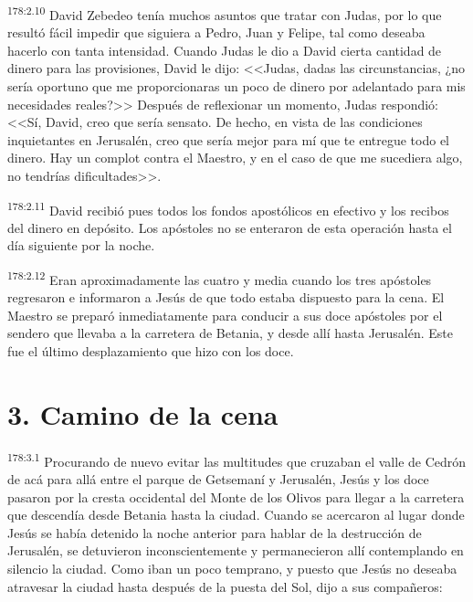 \par 
\textsuperscript{178:2.10} David Zebedeo tenía muchos asuntos que tratar con Judas, por lo que resultó fácil impedir que siguiera a Pedro, Juan y Felipe, tal como deseaba hacerlo con tanta intensidad. Cuando Judas le dio a David cierta cantidad de dinero para las provisiones, David le dijo: <<Judas, dadas las circunstancias, ¿no sería oportuno que me proporcionaras un poco de dinero por adelantado para mis necesidades reales?>> Después de reflexionar un momento, Judas respondió: <<Sí, David, creo que sería sensato. De hecho, en vista de las condiciones inquietantes en Jerusalén, creo que sería mejor para mí que te entregue todo el dinero. Hay un complot contra el Maestro, y en el caso de que me sucediera algo, no tendrías dificultades>>.

\par 
\textsuperscript{178:2.11} David recibió pues todos los fondos apostólicos en efectivo y los recibos del dinero en depósito. Los apóstoles no se enteraron de esta operación hasta el día siguiente por la noche.

\par 
\textsuperscript{178:2.12} Eran aproximadamente las cuatro y media cuando los tres apóstoles regresaron e informaron a Jesús de que todo estaba dispuesto para la cena. El Maestro se preparó inmediatamente para conducir a sus doce apóstoles por el sendero que llevaba a la carretera de Betania, y desde allí hasta Jerusalén. Este fue el último desplazamiento que hizo con los doce.

\section*{3. Camino de la cena}
\par 
\textsuperscript{178:3.1} Procurando de nuevo evitar las multitudes que cruzaban el valle de Cedrón de acá para allá entre el parque de Getsemaní y Jerusalén, Jesús y los doce pasaron por la cresta occidental del Monte de los Olivos para llegar a la carretera que descendía desde Betania hasta la ciudad. Cuando se acercaron al lugar donde Jesús se había detenido la noche anterior para hablar de la destrucción de Jerusalén, se detuvieron inconscientemente y permanecieron allí contemplando en silencio la ciudad. Como iban un poco temprano, y puesto que Jesús no deseaba atravesar la ciudad hasta después de la puesta del Sol, dijo a sus compañeros:

